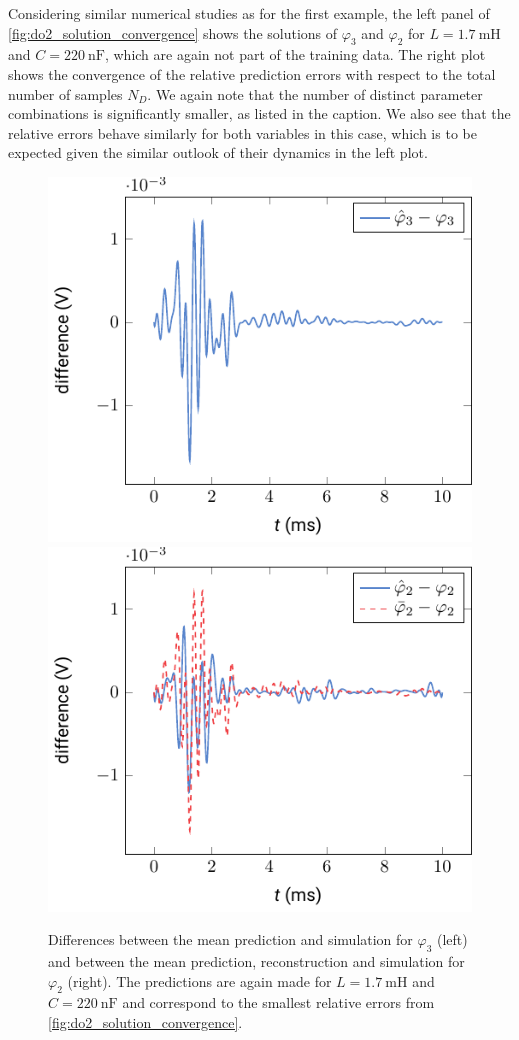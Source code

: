 \documentclass[AMA,STIX1COL]{WileyNJD-v2}
\begin{document}
Considering similar numerical studies as for the first example, the left panel of \autoref{fig:do2_solution_convergence} shows the solutions of $\varphi_3$ and $\varphi_2$ for $L = \SI{1.7}{\milli\henry}$ and $C = \SI{220}{\nano\farad}$, which are again not part of the training data. The right plot shows the convergence of the relative prediction errors with respect to the total number of samples $N_D$. We again note that the number of distinct parameter combinations is significantly smaller, as listed in the caption. We also see that the relative errors behave similarly for both variables in this case, which is to be expected given the similar outlook of their dynamics in the left plot.
\begin{figure}[t]
    \begin{center}
        \includegraphics[width=.4\textwidth]{do2_error_phi_3} \hspace{1.5cm} \includegraphics[width=.4\textwidth]{do2_error_phi_2}
    \end{center}
    \caption{Differences between the mean prediction and simulation for $\varphi_3$ (left) and between the mean prediction, reconstruction and simulation for $\varphi_2$ (right). The predictions are again made for $L = \SI{1.7}{\milli\henry}$ and $C = \SI{220}{\nano\farad}$ and correspond to the smallest relative errors from \autoref{fig:do2_solution_convergence}.}
    \label{fig:do2_error}
\end{figure}
\end{document}
